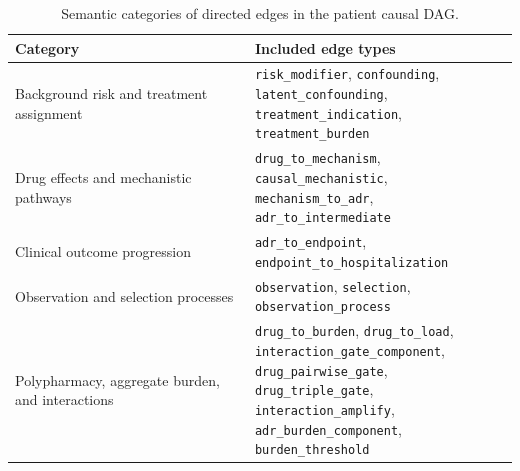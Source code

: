 \begin{table}[htbp]
    \centering
    \small
    \setlength{\tabcolsep}{5pt}
    \renewcommand{\arraystretch}{1.2}
    \caption{Semantic categories of directed edges in the patient causal DAG.}
    \label{tab:edge_type_categories}

    \begin{tabular}{@{}p{} p{}@{}}
        \toprule
        \textbf{Category} & \textbf{Included edge types} \\
        \midrule

        Background risk and treatment assignment &
        \makecell[l]{
            \texttt{risk\_modifier}, \texttt{confounding},\\
            \texttt{latent\_confounding}, \texttt{treatment\_indication},\\
            \texttt{treatment\_burden}
        } \\
        \addlinespace[3pt]

        Drug effects and mechanistic pathways &
        \makecell[l]{
            \texttt{drug\_to\_mechanism}, \texttt{causal\_mechanistic},\\
            \texttt{mechanism\_to\_adr}, \texttt{adr\_to\_intermediate}
        } \\
        \addlinespace[3pt]

        Clinical outcome progression &
        \makecell[l]{
            \texttt{adr\_to\_endpoint},\\
            \texttt{endpoint\_to\_hospitalization}
        } \\
        \addlinespace[3pt]

        Observation and selection processes &
        \makecell[l]{
            \texttt{observation}, \texttt{selection},\\
            \texttt{observation\_process}
        } \\
        \addlinespace[3pt]

        Polypharmacy, aggregate burden, and interactions &
        \makecell[l]{
            \texttt{drug\_to\_burden}, \texttt{drug\_to\_load},\\
            \texttt{interaction\_gate\_component},\\
            \texttt{drug\_pairwise\_gate}, \texttt{drug\_triple\_gate},\\
            \texttt{interaction\_amplify},\\
            \texttt{adr\_burden\_component}, \texttt{burden\_threshold}
        } \\
        \bottomrule
    \end{tabular}
\end{table}

